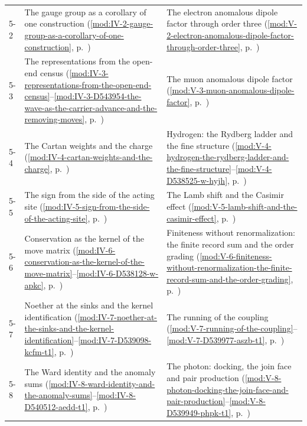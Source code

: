 {\begin{longtable}{p{11mm}p{70mm}p{60mm}}
5-2 & The gauge group as a corollary of one construction (\ref{mod:IV-2-gauge-group-as-a-corollary-of-one-construction}, p.~\pageref{mod:IV-2-gauge-group-as-a-corollary-of-one-construction}) & The electron anomalous dipole factor through order three (\ref{mod:V-2-electron-anomalous-dipole-factor-through-order-three}, p.~\pageref{mod:V-2-electron-anomalous-dipole-factor-through-order-three}) \\
5-3 & The representations from the open-end census (\ref{mod:IV-3-representations-from-the-open-end-census}--\ref{mod:IV-3-D543954-the-wave-as-the-carrier-advance-and-the-removing-moves}, p.~\pageref{mod:IV-3-representations-from-the-open-end-census}) & The muon anomalous dipole factor (\ref{mod:V-3-muon-anomalous-dipole-factor}, p.~\pageref{mod:V-3-muon-anomalous-dipole-factor}) \\
5-4 & The Cartan weights and the charge (\ref{mod:IV-4-cartan-weights-and-the-charge}, p.~\pageref{mod:IV-4-cartan-weights-and-the-charge}) & Hydrogen: the Rydberg ladder and the fine structure (\ref{mod:V-4-hydrogen-the-rydberg-ladder-and-the-fine-structure}--\ref{mod:V-4-D538525-w-hyjh}, p.~\pageref{mod:V-4-hydrogen-the-rydberg-ladder-and-the-fine-structure}) \\
5-5 & The sign from the side of the acting site (\ref{mod:IV-5-sign-from-the-side-of-the-acting-site}, p.~\pageref{mod:IV-5-sign-from-the-side-of-the-acting-site}) & The Lamb shift and the Casimir effect (\ref{mod:V-5-lamb-shift-and-the-casimir-effect}, p.~\pageref{mod:V-5-lamb-shift-and-the-casimir-effect}) \\
5-6 & Conservation as the kernel of the move matrix (\ref{mod:IV-6-conservation-as-the-kernel-of-the-move-matrix}--\ref{mod:IV-6-D538128-w-apkc}, p.~\pageref{mod:IV-6-conservation-as-the-kernel-of-the-move-matrix}) & Finiteness without renormalization: the finite record sum and the order grading (\ref{mod:V-6-finiteness-without-renormalization-the-finite-record-sum-and-the-order-grading}, p.~\pageref{mod:V-6-finiteness-without-renormalization-the-finite-record-sum-and-the-order-grading}) \\
5-7 & Noether at the sinks and the kernel identification (\ref{mod:IV-7-noether-at-the-sinks-and-the-kernel-identification}--\ref{mod:IV-7-D539098-kcfm-t1}, p.~\pageref{mod:IV-7-noether-at-the-sinks-and-the-kernel-identification}) & The running of the coupling (\ref{mod:V-7-running-of-the-coupling}--\ref{mod:V-7-D539977-aszb-t1}, p.~\pageref{mod:V-7-running-of-the-coupling}) \\
5-8 & The Ward identity and the anomaly sums (\ref{mod:IV-8-ward-identity-and-the-anomaly-sums}--\ref{mod:IV-8-D540512-aedd-t1}, p.~\pageref{mod:IV-8-ward-identity-and-the-anomaly-sums}) & The photon: docking, the join face and pair production (\ref{mod:V-8-photon-docking-the-join-face-and-pair-production}--\ref{mod:V-8-D539949-phpk-t1}, p.~\pageref{mod:V-8-photon-docking-the-join-face-and-pair-production}) \\

\end{longtable}}
